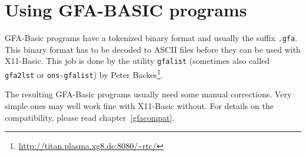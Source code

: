 \section{Using GFA-BASIC programs}

GFA-Basic programs have a tokenized binary format and usually the suffix 
\verb|.gfa|.
This binary format has to be decoded to ASCII files before they can be used with
X11-Basic. This job is done by the utility \verb|gfalist| (sometimes also
called  \verb|gfa2lst| or \verb|ons-gfalist|) by Peter 
Backes\footnote{\url{http://titan.plasma.xg8.de:8080/~rtc/}}.

The resulting GFA-Basic programs usually need some manual corrections. Very
simple ones may well work fine with X11-Basic without. For details on the
compatibility, please read chapter~\ref{gfacompat}.

